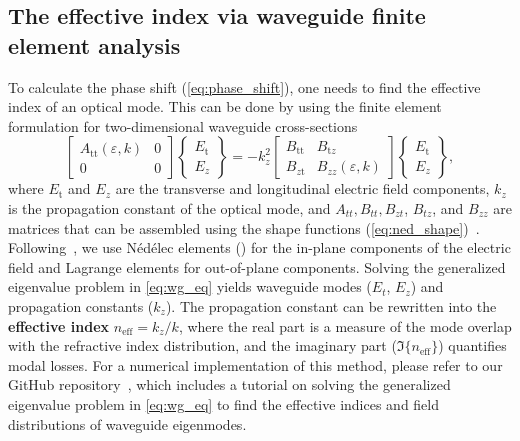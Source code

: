 \subsection*{The effective index via waveguide finite element analysis}

To calculate the phase shift (\eqref{eq:phase_shift}), one needs to find the effective index of an optical mode. This can be done by 
using the finite element formulation for two-dimensional waveguide cross-sections~\cite{jin}
\begin{equation}\label{eq:wg_eq}
 \left[\begin{array}{cc}
 A_{\text{tt}}(\varepsilon,k) & 0 \\
    0 & 0
    \end{array}\right]
 \left\{\begin{array}{l}
 E_{\text{t}} \\
 E_z
    \end{array}\right\}
 = -k_z^2
 \left[\begin{array}{cc}
 B_{\text{tt}} & B_{\text{t} z} \\
 B_{z \text{t}} & B_{z z}(\varepsilon,k)
    \end{array}\right]
 \left\{\begin{array}{c}
 E_{\text{t}} \\
 E_z
    \end{array}\right\},
    \end{equation}
where $E_{\text{t}}$ and $E_z$ are the transverse and longitudinal electric field components, $k_z$ is the propagation constant of the optical mode, and $A_{tt}, B_{tt},
B_{zt}$, $B_{tz}$, and $B_{zz}$ are matrices that can be assembled using the shape functions (\eqref{eq:ned_shape})~\cite{jin}. Following~\cite{jin}, we use Nédélec elements () for the in-plane components of the electric field and 
Lagrange elements for out-of-plane components. 
Solving the generalized eigenvalue problem in \eqref{eq:wg_eq} yields waveguide modes ($E_t$, $E_z$) and propagation constants ($k_z$). The propagation constant can be rewritten into the \textbf{effective index} $n_\text{eff} = k_z / k$,
 where the real part is a measure of the mode overlap with the refractive index distribution, and the imaginary part ($\Im\{n_\text{eff}\}$) quantifies modal losses. For a numerical implementation of this method, please refer to our GitHub repository~\cite{FEWEC}, which includes a tutorial on solving the 
 generalized eigenvalue problem in \eqref{eq:wg_eq} to find the effective indices and field distributions of waveguide eigenmodes.

